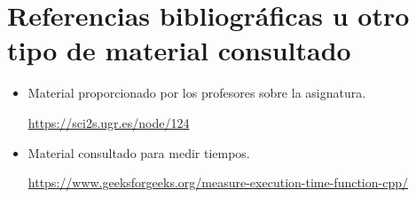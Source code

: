 \newpage

\section{Referencias bibliográficas u otro tipo de material consultado}

\begin{itemize}
	\item Material proporcionado por los profesores sobre la asignatura.
	
		\url{https://sci2s.ugr.es/node/124}
	\item Material consultado para medir tiempos.
	
		\url{https://www.geeksforgeeks.org/measure-execution-time-function-cpp/}
\end{itemize}